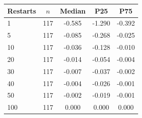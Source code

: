 \begin{tabular}{lcccc}
\toprule
Restarts & $n$ & Median & P25 & P75 \\
\midrule
1 & 117 & -0.585 & -1.290 & -0.392 \\
5 & 117 & -0.085 & -0.268 & -0.025 \\
10 & 117 & -0.036 & -0.128 & -0.010 \\
20 & 117 & -0.014 & -0.054 & -0.004 \\
30 & 117 & -0.007 & -0.037 & -0.002 \\
40 & 117 & -0.004 & -0.026 & -0.001 \\
50 & 117 & -0.002 & -0.019 & -0.001 \\
100 & 117 & 0.000 & 0.000 & 0.000 \\
\bottomrule
\end{tabular}
